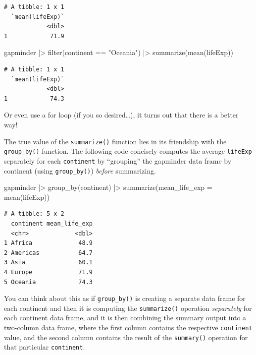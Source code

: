 \documentclass[
  letterpaper,
  DIV=11,
  numbers=noendperiod]{scrreprt}
\newenvironment{Shaded}{\begin{snugshade}}{\end{snugshade}}
\newcommand{\AttributeTok}[1]{\textcolor[rgb]{0.40,0.45,0.13}{#1}}
\newcommand{\FunctionTok}[1]{\textcolor[rgb]{0.28,0.35,0.67}{#1}}
\newcommand{\NormalTok}[1]{\textcolor[rgb]{0.00,0.23,0.31}{#1}}
\newcommand{\SpecialCharTok}[1]{\textcolor[rgb]{0.37,0.37,0.37}{#1}}
\newcommand{\StringTok}[1]{\textcolor[rgb]{0.13,0.47,0.30}{#1}}
\begin{document}
\begin{verbatim}
# A tibble: 1 x 1
  `mean(lifeExp)`
            <dbl>
1            71.9
\end{verbatim}

\begin{Shaded}
\begin{Highlighting}[]
\NormalTok{gapminder }\SpecialCharTok{|\textgreater{}} \FunctionTok{filter}\NormalTok{(continent }\SpecialCharTok{==} \StringTok{"Oceania"}\NormalTok{) }\SpecialCharTok{|\textgreater{}} \FunctionTok{summarize}\NormalTok{(}\FunctionTok{mean}\NormalTok{(lifeExp))}
\end{Highlighting}
\end{Shaded}

\begin{verbatim}
# A tibble: 1 x 1
  `mean(lifeExp)`
            <dbl>
1            74.3
\end{verbatim}

Or even use a for loop (if you so desired\ldots), it turns out that
there is a better way!

The true value of the \texttt{summarize()} function lies in its
friendship with the \texttt{group\_by()} function. The following code
concisely computes the average \texttt{lifeExp} separately for each
\texttt{continent} by ``grouping'' the gapminder data frame by continent
(using \texttt{group\_by()}) \emph{before} summarizing.

\begin{Shaded}
\begin{Highlighting}[]
\NormalTok{gapminder }\SpecialCharTok{|\textgreater{}} 
  \FunctionTok{group\_by}\NormalTok{(continent) }\SpecialCharTok{|\textgreater{}} 
  \FunctionTok{summarize}\NormalTok{(}\AttributeTok{mean\_life\_exp =} \FunctionTok{mean}\NormalTok{(lifeExp))}
\end{Highlighting}
\end{Shaded}

\begin{verbatim}
# A tibble: 5 x 2
  continent mean_life_exp
  <chr>             <dbl>
1 Africa             48.9
2 Americas           64.7
3 Asia               60.1
4 Europe             71.9
5 Oceania            74.3
\end{verbatim}

You can think about this as if \texttt{group\_by()} is creating a
separate data frame for each continent and then it is computing the
\texttt{summarize()} operation \emph{separately} for each continent data
frame, and it is then combining the summary output into a two-column
data frame, where the first column contains the respective
\texttt{continent} value, and the second column contains the result of
the \texttt{summary()} operation for that particular \texttt{continent}.
\end{document}
